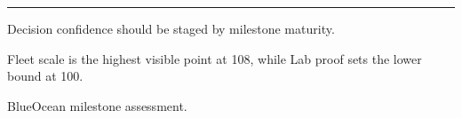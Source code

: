 \documentclass[10pt,a4paper]{article}
\begin{document}
\vspace{3pt}\noindent\begin{minipage}[t]{0.58\linewidth}
\textcolor{BOGreen}{\rule{24mm}{0.6pt}}\par\vspace{3pt}
{\footnotesize\color{BOText} Decision confidence should be staged by milestone maturity.}\par\vspace{2pt}
{\footnotesize\color{BOText} Fleet scale is the highest visible point at 108, while Lab proof sets the lower bound at 100.}\par\vspace{2pt}
\end{minipage}\hfill\begin{minipage}[t]{0.36\linewidth}
\par
\end{minipage}\par\vspace{2pt}
\par
{\scriptsize\color{BOMuted} BlueOcean milestone assessment.}\par
\end{document}
